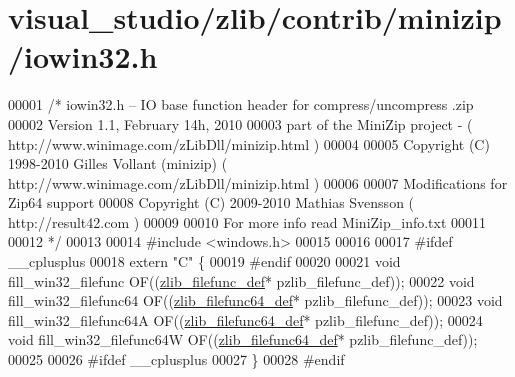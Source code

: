 \hypertarget{visual__studio_2zlib_2contrib_2minizip_2iowin32_8h_source}{}\section{visual\+\_\+studio/zlib/contrib/minizip/iowin32.h}
\label{visual__studio_2zlib_2contrib_2minizip_2iowin32_8h_source}

\begin{DoxyCode}
00001 \textcolor{comment}{/* iowin32.h -- IO base function header for compress/uncompress .zip}
00002 \textcolor{comment}{     Version 1.1, February 14h, 2010}
00003 \textcolor{comment}{     part of the MiniZip project - ( http://www.winimage.com/zLibDll/minizip.html )}
00004 \textcolor{comment}{}
00005 \textcolor{comment}{         Copyright (C) 1998-2010 Gilles Vollant (minizip) ( http://www.winimage.com/zLibDll/minizip.html )}
00006 \textcolor{comment}{}
00007 \textcolor{comment}{         Modifications for Zip64 support}
00008 \textcolor{comment}{         Copyright (C) 2009-2010 Mathias Svensson ( http://result42.com )}
00009 \textcolor{comment}{}
00010 \textcolor{comment}{         For more info read MiniZip\_info.txt}
00011 \textcolor{comment}{}
00012 \textcolor{comment}{*/}
00013 
00014 \textcolor{preprocessor}{#include <windows.h>}
00015 
00016 
00017 \textcolor{preprocessor}{#ifdef \_\_cplusplus}
00018 \textcolor{keyword}{extern} \textcolor{stringliteral}{"C"} \{
00019 \textcolor{preprocessor}{#endif}
00020 
00021 \textcolor{keywordtype}{void} fill\_win32\_filefunc OF((\hyperlink{structzlib__filefunc__def__s}{zlib\_filefunc\_def}* pzlib\_filefunc\_def));
00022 \textcolor{keywordtype}{void} fill\_win32\_filefunc64 OF((\hyperlink{structzlib__filefunc64__def__s}{zlib\_filefunc64\_def}* pzlib\_filefunc\_def));
00023 \textcolor{keywordtype}{void} fill\_win32\_filefunc64A OF((\hyperlink{structzlib__filefunc64__def__s}{zlib\_filefunc64\_def}* pzlib\_filefunc\_def));
00024 \textcolor{keywordtype}{void} fill\_win32\_filefunc64W OF((\hyperlink{structzlib__filefunc64__def__s}{zlib\_filefunc64\_def}* pzlib\_filefunc\_def));
00025 
00026 \textcolor{preprocessor}{#ifdef \_\_cplusplus}
00027 \}
00028 \textcolor{preprocessor}{#endif}
\end{DoxyCode}

